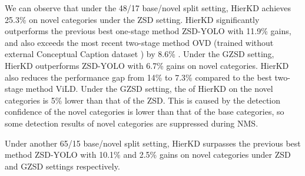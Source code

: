 \documentclass[10pt,twocolumn,letterpaper]{article}
\begin{document}
We can observe that under the 48/17 base/novel split setting, HierKD achieves 25.3\%  on novel categories under the ZSD setting. HierKD significantly outperforms the previous best one-stage method ZSD-YOLO with 11.9\%  gains, and also exceeds the most recent two-stage method OVD (trained without external Conceptual Caption dataset \cite{sharma2018conceptual}) by 8.6\% . Under the GZSD setting, HierKD outperforms ZSD-YOLO with 6.7\% gains on novel categories. HierKD also reduces the  performance gap from 14\% to 7.3\% compared to the best two-stage method ViLD. Under the GZSD setting, the  of HierKD on the novel categories is 5\% lower than that of the ZSD. This is caused by the detection confidence of the novel categories is lower than that of the base categories, so some detection results of novel categories are suppressed during NMS. 


Under another 65/15 base/novel split setting, HierKD surpasses the previous best method ZSD-YOLO with 10.1\% and 2.5\%  gains on novel categories under ZSD and GZSD settings respectively. 

\begin{table}[]
\centering
\smaller
{}
\caption{Verification of the compatibility with general detection performance improvement techniques.}
\label{tab:gene_impro}
\vspace{-1.0em}
\end{table}


\begin{table}[]
\centering
\footnotesize
{}
\caption{Comparison with the ideal upper bound. All reported metrics are results on the novel categories.}
\label{tab:upper-bound}
\vspace{-1.8em}
\end{table}
\end{document}
